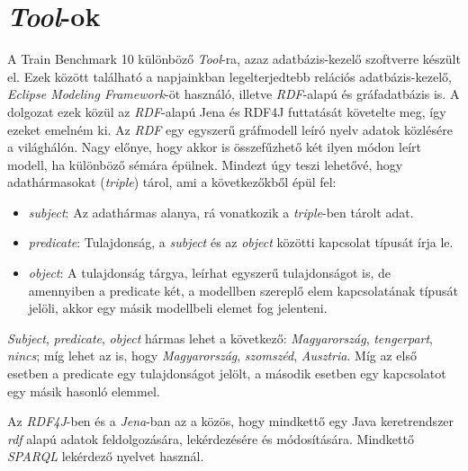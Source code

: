\section{\emph{Tool}-ok}

A Train Benchmark 10 különböző \emph{Tool}-ra, azaz adatbázis-kezelő szoftverre készült el. Ezek között található a napjainkban legelterjedtebb relációs adatbázis-kezelő, \emph{Eclipse Modeling Framework}-öt használó, illetve \emph{RDF}-alapú és gráfadatbázis is. A dolgozat ezek közül az \emph{RDF}-alapú Jena és  RDF4J futtatását követelte meg, így ezeket emelném ki. Az \emph{RDF} egy egyszerű gráfmodell leíró nyelv adatok közlésére a világhálón. Nagy előnye, hogy akkor is összefűzhető két ilyen módon leírt modell, ha különböző sémára épülnek. Mindezt úgy teszi lehetővé, hogy adathármasokat (\emph{triple}) tárol, ami a következőkből épül fel:
\begin{itemize}
	\item \emph{subject}: Az adathármas alanya, rá vonatkozik a \emph{triple}-ben tárolt adat.
	\item \emph{predicate}: Tulajdonság, a \emph{subject} és az \emph{object} közötti kapcsolat típusát írja le.
	\item \emph{object}: A tulajdonság tárgya, leírhat egyszerű tulajdonságot is, de amennyiben a predicate két, a modellben szereplő elem kapcsolatának típusát jelöli, akkor egy másik modellbeli elemet fog jelenteni.
\end{itemize}

\emph{Subject}, \emph{predicate}, \emph{object} hármas lehet a következő: \emph{Magyarország}, \emph{tengerpart}, \emph{nincs}; míg lehet az is, hogy \emph{Magyarország}, \emph{szomszéd}, \emph{Ausztria}. Míg az első esetben a predicate egy tulajdonságot jelölt, a második esetben egy kapcsolatot egy másik hasonló elemmel.

Az \emph{RDF4J}-ben és a \emph{Jena}-ban az a közös, hogy mindkettő egy Java keretrendszer \emph{rdf} alapú adatok feldolgozására, lekérdezésére és módosítására. Mindkettő \emph{SPARQL} lekérdező nyelvet használ.